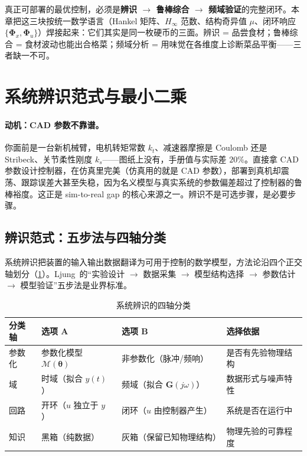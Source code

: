 \begin{insight}
真正可部署的最优控制，必须是\textbf{辨识 $\to$ 鲁棒综合 $\to$ 频域验证}的完整闭环。本章把这三块按统一数学语言（Hankel 矩阵、$H_\infty$ 范数、结构奇异值 $\mu$、闭环响应 $\{\boldsymbol\Phi_x,\boldsymbol\Phi_u\}$）焊接起来：它们其实是同一枚硬币的三面。辨识 = 品尝食材；鲁棒综合 = 食材波动也能出合格菜；频域分析 = 用味觉在各维度上诊断菜品平衡——三者缺一不可。
\end{insight}

\section{系统辨识范式与最小二乘}
\label{sec:sysid-ls}

\paragraph{动机：CAD 参数不靠谱。}
你面前是一台新机械臂，电机转矩常数 $k_t$、减速器摩擦是 Coulomb 还是 Stribeck、关节柔性刚度 $k_s$——图纸上没有，手册值与实际差 $20\%$。直接拿 CAD 参数设计控制器，在仿真里完美（仿真用的就是 CAD 参数），部署到真机却震荡、跟踪误差大甚至失稳，因为名义模型与真实系统的参数偏差超过了控制器的鲁棒裕度。这正是 sim-to-real gap 的核心来源之一。辨识不是可选步骤，是必要步骤。

\subsection{辨识范式：五步法与四轴分类}
系统辨识把装置的输入输出数据翻译为可用于控制的数学模型，方法论沿四个正交轴划分（\cref{tab:sysid-taxonomy}）。Ljung\,\cite{ljung1999sysid} 的“实验设计 $\to$ 数据采集 $\to$ 模型结构选择 $\to$ 参数估计 $\to$ 模型验证”五步法是业界标准。

\begin{table}[H]\centering\small
\caption{系统辨识的四轴分类}
\label{tab:sysid-taxonomy}
\begin{tabular}{llll}
\toprule
分类轴 & 选项 A & 选项 B & 选择依据 \\
\midrule
参数化 & 参数化模型 $\mathcal M(\boldsymbol\theta)$ & 非参数化（脉冲/频响） & 是否有先验物理结构 \\
域 & 时域（拟合 $y(t)$） & 频域（拟合 $\mathbf G(j\omega)$） & 数据形式与噪声特性 \\
回路 & 开环（$u$ 独立于 $y$） & 闭环（$u$ 由控制器产生） & 系统是否在运行中 \\
知识 & 黑箱（纯数据） & 灰箱（保留已知物理结构） & 物理先验的可靠程度 \\
\bottomrule
\end{tabular}
\end{table}

